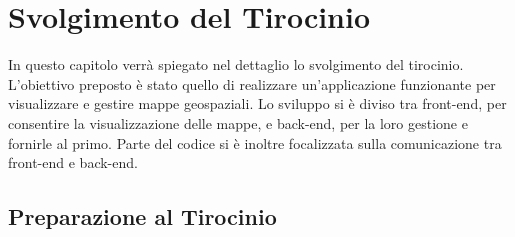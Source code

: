 \chapter{Svolgimento del Tirocinio}

In questo capitolo verrà spiegato nel dettaglio lo svolgimento del tirocinio. L'obiettivo preposto è stato quello di realizzare un'applicazione funzionante per visualizzare e gestire mappe geospaziali. Lo sviluppo si è diviso tra front-end, per consentire la visualizzazione delle mappe, e back-end, per la loro gestione e fornirle al primo. Parte del codice si è inoltre focalizzata sulla comunicazione tra front-end e back-end.

\section{Preparazione al Tirocinio}

